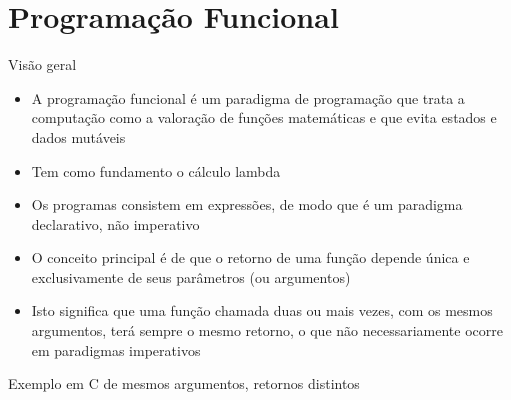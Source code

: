 \section{Programação Funcional}

\begin{frame}[fragile]{Visão geral}

    \begin{itemize}
        \item A programação funcional é um paradigma de programação que trata a computação como
            a valoração de funções matemáticas e que evita estados e dados mutáveis

        \item Tem como fundamento o cálculo lambda

        \item Os programas consistem em expressões, de modo que é um paradigma declarativo, não
            imperativo

        \item O conceito principal é de que o retorno de uma função depende única e exclusivamente
            de seus parâmetros (ou argumentos)

        \item Isto significa que uma função chamada duas ou mais vezes, com os mesmos
            argumentos, 
            terá sempre o mesmo retorno, o que não necessariamente ocorre em paradigmas
            imperativos

    \end{itemize}

\end{frame}

\begin{frame}[fragile]{Exemplo em C de mesmos argumentos, retornos distintos}
\end{frame}

